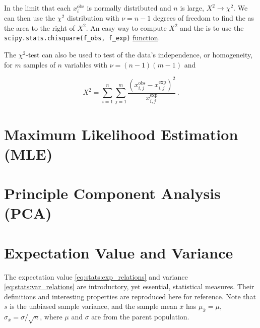 In the limit that each $x^{\text{obs}}_{i}$ is normally distributed and $n$ is large, $X^{2} \to \chi^{2}$.
We can then use the $\chi^{2}$ distribution with $\nu = n-1$ degrees of freedom to find the \pvalue as the area to the right of $X^{2}$.
An easy way to compute $X^{2}$ and the \pvalue is to use the \texttt{scipy.stats.chisquare(f\_obs, f\_exp)}
\href{https://docs.scipy.org/doc/scipy/reference/generated/scipy.stats.chisquare.html}{function}.

The $\chi^{2}$-test can also be used to test of the data's independence, or homogeneity,
for $m$ samples of $n$ variables with $\nu = \left(n-1\right)\left(m-1\right)$ and

\begin{equation}\label{eq:stats:chi2_score_ind}
X^{2} = \sum_{i=1}^{n} \sum_{j=1}^{m} \frac{\left(x^{\text{obs}}_{i,j} - x^{\text{exp}}_{i,j}\right)^{2}}{x^{\text{exp}}_{i,j}}\,.
\end{equation}

\section{Maximum Likelihood Estimation (MLE)}
\label{stats:MLE}


\section{Principle Component Analysis (PCA)}
\label{stats:PCA}

\section{Expectation Value and Variance}
\label{stats:expval_and_var}

The expectation value \cref{eq:stats:exp_relations} and variance \cref{eq:stats:var_relations} are introductory, yet essential, statistical measures.
Their definitions and interesting properties are reproduced here for reference.
Note that $s$ is the unbiased sample variance,
and the sample mean $\bar{x}$ has $\mu_{\bar{x}} = \mu$, $\sigma_{\bar{x}} = \sigma / \sqrt{n}$,
where $\mu$ and $\sigma$ are from the parent population.

